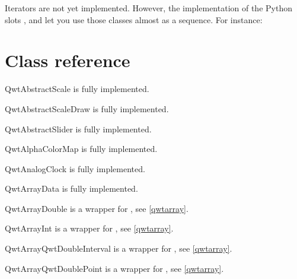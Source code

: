\documentclass{manual}
\newcommand{\PyQwtLatestTarGz}{\ulink{PyQwt-5.0.1.tar.gz}
  {http://prdownloads.sourceforge.net/pyqwt/PyQwt-5.0.1.tar.gz?download}}
\newcommand{\Future}{
  \begin{notice}[warning]
    The documentation is for PyQwt-5.0.1 which has not yet been released. The
    latest release is \PyQwtLatestTarGz{} and refer to the documentation
    included in the latest release when using it.
  \end{notice}
}
\renewcommand{\Future}{}
\begin{document}
Iterators are not yet implemented. However, the implementation of the
Python slots ,  and
 let you use those classes almost as a sequence.
For instance:




\section{Class reference \label{classes}}

\Future{}


\begin{classdesc*}{QwtAbstractScale}
  is fully implemented.
\end{classdesc*}

\begin{classdesc*}{QwtAbstractScaleDraw}
  is fully implemented.
\end{classdesc*}

\begin{classdesc*}{QwtAbstractSlider}
  is fully implemented.
\end{classdesc*}

\begin{classdesc*}{QwtAlphaColorMap}
  is fully implemented.
\end{classdesc*}

\begin{classdesc*}{QwtAnalogClock}
  is fully implemented.
\end{classdesc*}

\begin{classdesc*}{QwtArrayData}
  is fully implemented.
\end{classdesc*}

\begin{classdesc*}{QwtArrayDouble}
  is a wrapper for , see \ref{qwtarray}.
\end{classdesc*}

\begin{classdesc*}{QwtArrayInt}
  is a wrapper for , see \ref{qwtarray}.
\end{classdesc*}

\begin{classdesc*}{QwtArrayQwtDoubleInterval}
  is a wrapper for , see \ref{qwtarray}.
\end{classdesc*}

\begin{classdesc*}{QwtArrayQwtDoublePoint}
  is a wrapper for , see \ref{qwtarray}.
\end{classdesc*}
\end{document}
